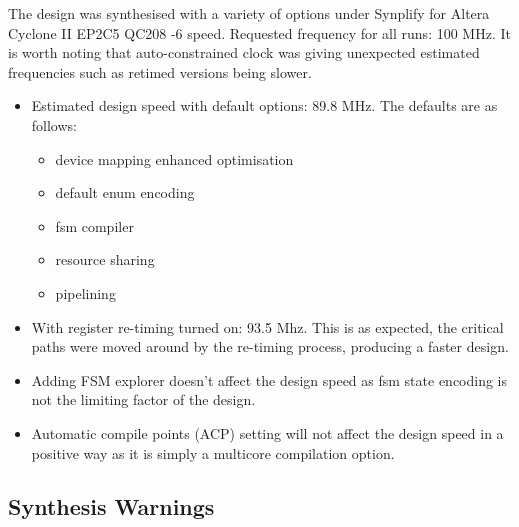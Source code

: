 \documentclass[]{article}
\begin{document}
The design was synthesised with a variety of options under Synplify for Altera Cyclone II EP2C5 QC208 -6 speed. Requested frequency for all runs: 100 MHz. It is worth noting that auto-constrained clock was giving unexpected estimated frequencies such as retimed versions being slower.
\begin{itemize}
	\item Estimated design speed with default options: 89.8 MHz. The defaults are as follows:

	\begin{itemize}
		\item device mapping enhanced optimisation
		\item default enum encoding
		\item fsm compiler
		\item resource sharing
		\item pipelining
	\end{itemize}

\item With register re-timing turned on: 93.5 Mhz. This is as expected, the critical paths were moved around by the re-timing process, producing a faster design.

\item Adding FSM explorer doesn't affect the design speed as fsm state encoding is not the limiting factor of the design.

\item Automatic compile points (ACP) setting will not affect the design speed in a positive way as it is simply a multicore compilation option.

\end{itemize}

\label{sub:synthesis_option_space_exploration}


\subsection{Synthesis Warnings} %
\label{sub:synthesis_warnings}
\end{document}
